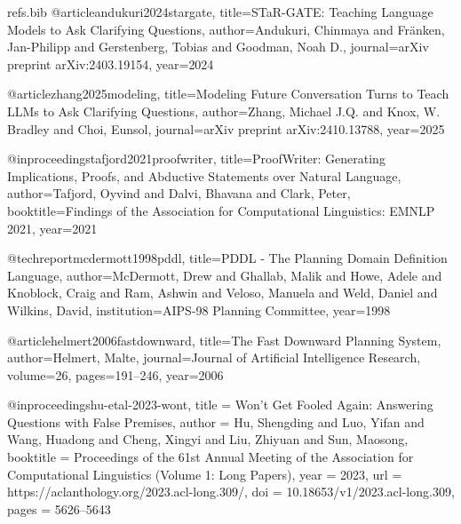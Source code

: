\begin{filecontents*}{refs.bib}
@article{andukuri2024stargate,
  title={STaR-GATE: Teaching Language Models to Ask Clarifying Questions},
  author={Andukuri, Chinmaya and Fr{\"a}nken, Jan-Philipp and Gerstenberg, Tobias and Goodman, Noah D.},
  journal={arXiv preprint arXiv:2403.19154},
  year={2024}
}

@article{zhang2025modeling,
  title={Modeling Future Conversation Turns to Teach LLMs to Ask Clarifying Questions},
  author={Zhang, Michael J.Q. and Knox, W. Bradley and Choi, Eunsol},
  journal={arXiv preprint arXiv:2410.13788},
  year={2025}
}

@inproceedings{tafjord2021proofwriter,
  title={ProofWriter: Generating Implications, Proofs, and Abductive Statements over Natural Language},
  author={Tafjord, Oyvind and Dalvi, Bhavana and Clark, Peter},
  booktitle={Findings of the Association for Computational Linguistics: EMNLP 2021},
  year={2021}
}

@techreport{mcdermott1998pddl,
  title={PDDL - The Planning Domain Definition Language},
  author={McDermott, Drew and Ghallab, Malik and Howe, Adele and Knoblock, Craig and Ram, Ashwin and Veloso, Manuela and Weld, Daniel and Wilkins, David},
  institution={AIPS-98 Planning Committee},
  year={1998}
}

@article{helmert2006fastdownward,
  title={The Fast Downward Planning System},
  author={Helmert, Malte},
  journal={Journal of Artificial Intelligence Research},
  volume={26},
  pages={191--246},
  year={2006}
}

@inproceedings{hu-etal-2023-wont,
  title = {Won't Get Fooled Again: Answering Questions with False Premises},
  author = {Hu, Shengding and Luo, Yifan and Wang, Huadong and Cheng, Xingyi and Liu, Zhiyuan and Sun, Maosong},
  booktitle = {Proceedings of the 61st Annual Meeting of the Association for Computational Linguistics (Volume 1: Long Papers)},
  year = {2023},
  url = {https://aclanthology.org/2023.acl-long.309/},
  doi = {10.18653/v1/2023.acl-long.309},
  pages = {5626--5643}
}
\end{filecontents*}

\documentclass{article}


\usepackage[T1]{fontenc}
\usepackage[utf8]{inputenc}
\usepackage{url}
\usepackage{booktabs}
\usepackage{amsmath}
\usepackage{amssymb}
\usepackage{graphicx}
\usepackage{xcolor}
\usepackage{multirow}
\usepackage{array}
\usepackage{hyperref}
\usepackage{enumitem}

